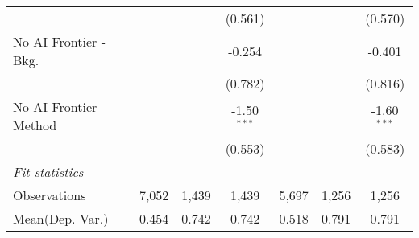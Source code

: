 \begin{tabular}{lcccccc}
                           &               &         & (0.561)       &               &         & (0.570)\\   
   No AI Frontier - Bkg.   &               &         & -0.254        &               &         & -0.401\\   
                           &               &         & (0.782)       &               &         & (0.816)\\   
   No AI Frontier - Method &               &         & -1.50$^{***}$ &               &         & -1.60$^{***}$\\   
                           &               &         & (0.553)       &               &         & (0.583)\\   
   \midrule
   \emph{Fit statistics}\\
   Observations            & 7,052         & 1,439   & 1,439         & 5,697         & 1,256   & 1,256\\  
Mean(Dep. Var.) & 0.454 & 0.742 & 0.742 & 0.518 & 0.791 & 0.791 \\
   

\end{tabular}
